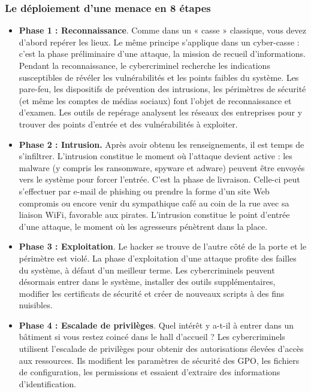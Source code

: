 \subsubsection{Le déploiement d'une menace en 8 étapes}


\begin{itemize}
  \item \textbf{Phase 1 : Reconnaissance}. Comme dans un « casse » classique, vous devez d’abord repérer les lieux. Le même principe s’applique dans un cyber-casse : c’est la phase préliminaire d’une attaque, la mission de recueil d’informations. Pendant la reconnaissance, le cybercriminel recherche les indications susceptibles de révéler les vulnérabilités et les points faibles du système. Les pare-feu, les dispositifs de prévention des intrusions, les périmètres de sécurité (et même les comptes de médias sociaux) font l’objet de reconnaissance et d’examen. Les outils de repérage analysent les réseaux des entreprises pour y trouver des points d’entrée et des vulnérabilités à exploiter.

 \item \textbf{Phase 2 : Intrusion.} Après avoir obtenu les renseignements, il est temps de s’infiltrer. L’intrusion constitue le moment où l’attaque devient active : les malware (y compris les ransomware, spyware et adware) peuvent être envoyés vers le système pour forcer l’entrée. C’est la phase de livraison. Celle-ci peut s’effectuer par e-mail de phishing ou prendre la forme d’un site Web compromis ou encore venir du sympathique café au coin de la rue avec sa liaison WiFi, favorable aux pirates. L’intrusion constitue le point d’entrée d’une attaque, le moment où les agresseurs pénètrent dans la place.

 \item \textbf{Phase 3 : Exploitation}. Le hacker se trouve de l’autre côté de la porte et le périmètre est violé. La phase d’exploitation d’une attaque profite des failles du système, à défaut d’un meilleur terme. Les cybercriminels peuvent désormais entrer dans le système, installer des outils supplémentaires, modifier les certificats de sécurité et créer de nouveaux scripts à des fins nuisibles.

 \item \textbf{Phase 4 : Escalade de privilèges}. Quel intérêt y a-t-il à entrer dans un bâtiment si vous restez coincé dans le hall d’accueil ? Les cybercriminels utilisent l’escalade de privilèges pour obtenir des autorisations élevées d’accès aux ressources. Ils modifient les paramètres de sécurité des GPO, les fichiers de configuration, les permissions et essaient d’extraire des informations d’identification.


\end{itemize}
